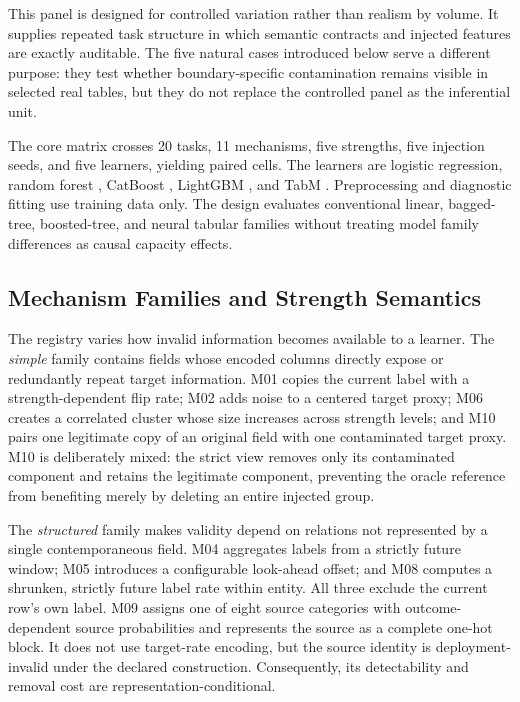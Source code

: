 \documentclass[sigconf,review]{acmart}
\begin{document}
This panel is designed for controlled variation rather than realism by volume.
It supplies repeated task structure in which semantic contracts and injected
features are exactly auditable. The five natural cases introduced below serve
a different purpose: they test whether boundary-specific contamination remains
visible in selected real tables, but they do not replace the controlled panel
as the inferential unit.

The core matrix crosses 20 tasks, 11 mechanisms, five strengths, five
injection seeds, and five learners, yielding \CoreCellCount{} paired cells. The
learners are logistic regression, random forest \cite{breiman2001random},
CatBoost \cite{prokhorenkova2018catboost}, LightGBM \cite{ke2017lightgbm}, and
TabM \cite{gorishniy2025tabm}. Preprocessing and diagnostic fitting use training
data only. The design evaluates conventional linear, bagged-tree, boosted-tree,
and neural tabular families without treating model family differences as causal
capacity effects.

\subsection{Mechanism Families and Strength Semantics}

The registry varies how invalid information becomes available to a learner.
The \emph{simple} family contains fields whose encoded columns directly expose
or redundantly repeat target information. M01 copies the current label with a
strength-dependent flip rate; M02 adds noise to a centered target proxy; M06
creates a correlated cluster whose size increases across strength levels; and
M10 pairs one legitimate copy of an original field with one contaminated
target proxy. M10 is deliberately mixed: the strict view removes only its
contaminated component and retains the legitimate component, preventing the
oracle reference from benefiting merely by deleting an entire injected group.

The \emph{structured} family makes validity depend on relations not represented
by a single contemporaneous field. M04 aggregates labels from a strictly future
window; M05 introduces a configurable look-ahead offset; and M08 computes a
shrunken, strictly future label rate within entity. All three exclude the
current row's own label. M09 assigns one of eight source categories with
outcome-dependent source probabilities and represents the source as a complete
one-hot block. It does not use target-rate encoding, but the source identity is
deployment-invalid under the declared construction. Consequently, its
detectability and removal cost are representation-conditional.
\end{document}
